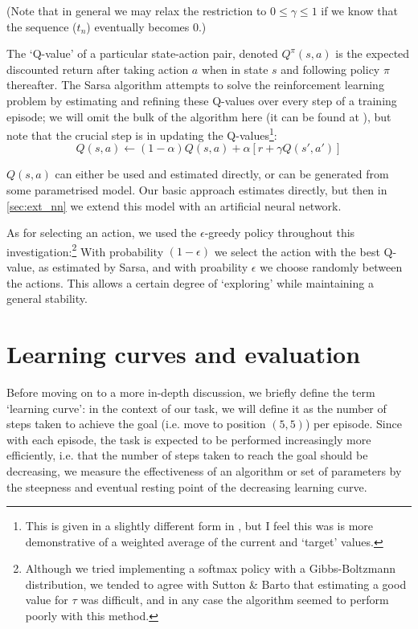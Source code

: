 \documentclass[a4paper, 11pt, twocolumn, draft]{article} %
\begin{document}
(Note that in general we may relax the restriction to $0 \le \gamma \le 1$ if we
know that the sequence ($t_n$) eventually becomes 0.)

The `Q-value' of a particular state-action pair, denoted $Q^\pi(s, a)$ is the
expected discounted return after taking action $a$ when in state $s$ and
following policy $\pi$ thereafter.  The Sarsa algorithm attempts to solve the
reinforcement learning problem by estimating and refining these Q-values over
every step of a training episode; we will omit the bulk of the algorithm here
(it can be found at \cite[p.~146]{Sutton1998}), but note that the crucial step
is in updating the Q-values\footnote{This is given in a slightly different form
in \cite{Sutton1998}, but I feel this was is more demonstrative of a weighted
average of the current and `target' values.}:
\begin{equation}
Q(s, a) \leftarrow (1-\alpha)Q(s, a) + \alpha[r + \gamma Q(s', a')]
\end{equation}

$Q(s, a)$ can either be used and estimated directly, or can be generated from
some parametrised model.  Our basic approach estimates directly, but then in
\autoref{sec:ext_nn} we extend this model with an artificial neural network.

As for selecting an action, we used the $\epsilon$-greedy policy throughout this
investigation:\footnote{Although we tried implementing a softmax policy with a
Gibbs-Boltzmann distribution, we tended to agree with Sutton \& Barto that
estimating a good value for $\tau$ was difficult, and in any case the algorithm
seemed to perform poorly with this method.}  With probability $(1-\epsilon)$ we
select the action with the best Q-value, as estimated by Sarsa, and with
proability $\epsilon$ we choose randomly between the actions.  This allows a
certain degree of `exploring' while maintaining a general stability.

\section{Learning curves and evaluation} Before moving on to a more in-depth
discussion, we briefly define the term `learning curve': in the context of our
task, we will define it as the number of steps taken to achieve the goal (i.e.
move to position $(5, 5)$) per episode.  Since with each episode, the task is
expected to be performed increasingly more efficiently, i.e. that the number of
steps taken to reach the goal should be decreasing, we measure the effectiveness
of an algorithm or set of parameters by the steepness and eventual resting point
of the decreasing learning curve.
\end{document}
